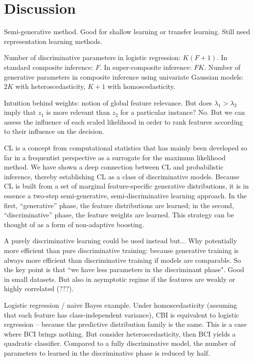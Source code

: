 \documentclass[english]{scrartcl}
\begin{document}
\section{Discussion}
\label{sec:discussion}

{\color{red} Semi-generative method. Good for shallow learning or transfer learning. Still need representation learning methods.}

Number of discriminative parameters in logistic regression: $K(F+1)$. In standard composite inference: $F$. In super-composite inference: $FK$. Number of generative parameters in composite inference using univariate Gaussian models: $2K$ with heteroscedasticity, $K+1$ with homoscedasticity. 

Intuition behind weights: notion of global feature relevance. But does $\lambda_1>\lambda_2$ imply that $z_1$ is more relevant than $z_2$ for a particular instance? No. But we can assess the influence of each scaled likelihood in order to rank features according to their influence on the decision.

CL is a concept from computational statistics that has mainly been developed so far in a frequentist perspective as a surrogate for the maximum likelihood method. We have shown a deep connection between CL and probabilistic inference, thereby establishing CL as a class of discriminative models. Because CL is built from a set of marginal feature-specific generative distributions, it is in essence a two-step semi-generative, semi-discriminative learning approach. In the first, ``generative'' phase, the feature distributions are learned; in the second, ``discriminative'' phase, the feature weights are learned. This strategy can be thought of as a form of non-adaptive boosting.


A purely discriminative learning could be used instead but...
Why potentially more efficient than pure discriminative training: because generative training is always more efficient than discriminative training if models are comparable. So the key point is that ``we have less parameters in the discriminant phase". Good in small datasets. But also in asymptotic regime if the features are weakly or highly correlated (???).

Logistic regression / naive Bayes example. Under homoscedasticity (assuming that each feature has class-independent variance), CBI is equivalent to logistic regression -- because the predictive distribution family is the same. This is a case where BCI brings nothing. But consider heteroscedasticity, then BCI yields a quadratic classifier. Compared to a fully discriminative model, the number of parameters to learned in the discriminative phase is reduced by half.
\end{document}
